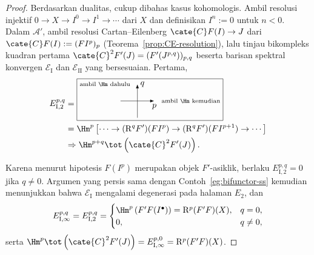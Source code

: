 \begin{proof}
	Berdasarkan dualitas, cukup dibahas kasus kohomologis. Ambil resolusi
	injektif $0\to X\to I^0\to I^1\to\cdots$ dari $X$ dan definisikan
	$I^n:=0$ untuk $n<0$. Dalam $\mathcal{A}'$, ambil resolusi
	Cartan--Eilenberg $\cate{C}F(I)\to J$ dari
	$\cate{C}F(I):=(FI^p)_p$ (Teorema~\ref{prop:CE-resolution}), lalu tinjau
	bikompleks kuadran pertama
	$\cate{C}^2F'(J)=(F'(J^{p,q}))_{p,q}$ beserta barisan spektral konvergen
	$\mathscr{E}_{\mathrm{I}}$ dan $\mathscr{E}_{\mathrm{II}}$ yang
	bersesuaian. Pertama,
	\begin{align*}
		E_{\mathrm{I},2}^{p, q} & =
		\begin{tikzpicture}[scale=0.7, baseline=(O)]
			\draw[-Latex] (0, -1) -- (0, 1) node[right] {$q$} node[left=0.5em] {\scriptsize\text{ambil $\Hm$ dahulu}};
			\draw[-Latex] (-1, 0) -- (1, 0) node[below] {$p$} node[right=0.5em] {\scriptsize\text{ambil $\Hm$ kemudian}};
			\coordinate (O) at (0, -0.3);
			\draw (current bounding box.north west) rectangle ([yshift=-1ex] current bounding box.south east);
		\end{tikzpicture} \\
		& = \Hm^p\left[ \cdots \to (\mathrm{R}^q F')(FI^p) \to (\mathrm{R}^q F')(FI^{p+1}) \to \cdots \right] \\
		& \Rightarrow \Hm^{p+q}\tot\left(\cate{C}^2 F'(J)\right).
	\end{align*}

	Karena menurut hipotesis $F(I^p)$ merupakan objek $F'$-asiklik, berlaku
	$E_{\mathrm{I},2}^{p,q}=0$ jika $q\neq0$. Argumen yang persis sama dengan
	Contoh~\ref{eg:bifunctor-ss} kemudian menunjukkan bahwa
	$\mathscr{E}_{\mathrm{I}}$ mengalami degenerasi pada halaman $E_2$, dan
	\[ E_{\mathrm{I}, \infty}^{p,q} = E_{\mathrm{I}, 2}^{p,q} = \begin{cases}
		\Hm^p\left( F'F(I^\bullet) \right) = \mathrm{R}^p (F' F)(X), & q = 0, \\
		0, & q \neq 0,
	\end{cases}\]
	serta
	$\Hm^p\tot\left(\cate{C}^2F'(J)\right)
	=E_{\mathrm{I},\infty}^{p,0}=\mathrm{R}^p(F'F)(X)$.


\end{proof}
